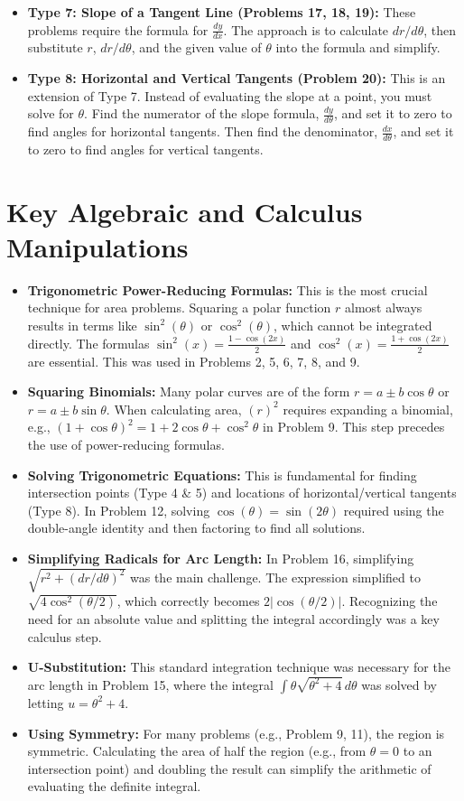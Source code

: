 \documentclass{article}
\begin{document}
\begin{itemize}
    \item \textbf{Type 7: Slope of a Tangent Line (Problems 17, 18, 19):} These problems require the formula for $\frac{dy}{dx}$. The approach is to calculate $dr/d\theta$, then substitute $r$, $dr/d\theta$, and the given value of $\theta$ into the formula and simplify.
    \item \textbf{Type 8: Horizontal and Vertical Tangents (Problem 20):} This is an extension of Type 7. Instead of evaluating the slope at a point, you must solve for $\theta$. Find the numerator of the slope formula, $\frac{dy}{d\theta}$, and set it to zero to find angles for horizontal tangents. Then find the denominator, $\frac{dx}{d\theta}$, and set it to zero to find angles for vertical tangents.
\end{itemize}

\section{Key Algebraic and Calculus Manipulations}
\begin{itemize}
    \item \textbf{Trigonometric Power-Reducing Formulas:} This is the most crucial technique for area problems. Squaring a polar function $r$ almost always results in terms like $\sin^2(\theta)$ or $\cos^2(\theta)$, which cannot be integrated directly. The formulas $\sin^2(x) = \frac{1-\cos(2x)}{2}$ and $\cos^2(x) = \frac{1+\cos(2x)}{2}$ are essential. This was used in Problems 2, 5, 6, 7, 8, and 9.
    \item \textbf{Squaring Binomials:} Many polar curves are of the form $r = a \pm b\cos\theta$ or $r = a \pm b\sin\theta$. When calculating area, $(r)^2$ requires expanding a binomial, e.g., $(1+\cos\theta)^2 = 1 + 2\cos\theta + \cos^2\theta$ in Problem 9. This step precedes the use of power-reducing formulas.
    \item \textbf{Solving Trigonometric Equations:} This is fundamental for finding intersection points (Type 4 \& 5) and locations of horizontal/vertical tangents (Type 8). In Problem 12, solving $\cos(\theta) = \sin(2\theta)$ required using the double-angle identity and then factoring to find all solutions.
    \item \textbf{Simplifying Radicals for Arc Length:} In Problem 16, simplifying $\sqrt{r^2 + (dr/d\theta)^2}$ was the main challenge. The expression simplified to $\sqrt{4\cos^2(\theta/2)}$, which correctly becomes $2|\cos(\theta/2)|$. Recognizing the need for an absolute value and splitting the integral accordingly was a key calculus step.
    \item \textbf{U-Substitution:} This standard integration technique was necessary for the arc length in Problem 15, where the integral $\int \theta\sqrt{\theta^2+4}\,d\theta$ was solved by letting $u=\theta^2+4$.
    \item \textbf{Using Symmetry:} For many problems (e.g., Problem 9, 11), the region is symmetric. Calculating the area of half the region (e.g., from $\theta=0$ to an intersection point) and doubling the result can simplify the arithmetic of evaluating the definite integral.
\end{itemize}
\end{document}
